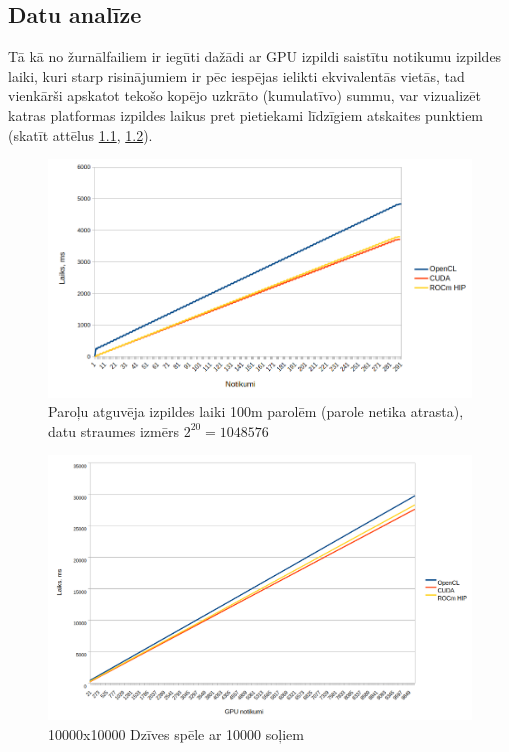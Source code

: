 \begin{center}
    \chapter{Datu analīze}
\end{center}

Tā kā no žurnālfailiem ir iegūti dažādi ar GPU izpildi saistītu notikumu
izpildes laiki, kuri starp risinājumiem ir pēc iespējas ielikti ekvivalentās
vietās, tad vienkārši apskatot tekošo kopējo uzkrāto (kumulatīvo) summu,
var vizualizēt katras platformas izpildes laikus pret pietiekami
līdzīgiem atskaites punktiem (skatīt attēlus \ref{img:sha256_100m_not_found_cum},
\ref{img:gol_10k10k_10k_steps_cum}).

\begin{figure}[H]
    \centering
    \includegraphics[width=\textwidth]{images/sha256_100m_not_found.png}
    \caption{Paroļu atguvēja izpildes laiki 100m parolēm (parole netika
    atrasta), datu straumes izmērs \( 2^{20} = 1048576\)}
    \label{img:sha256_100m_not_found_cum}
\end{figure}

\begin{figure}[H]
    \centering
    \includegraphics[width=\textwidth]{images/gol_10k_by_10k_10ksteps.png}
    \caption{10000x10000 Dzīves spēle ar 10000 soļiem}
    \label{img:gol_10k10k_10k_steps_cum}
\end{figure}


